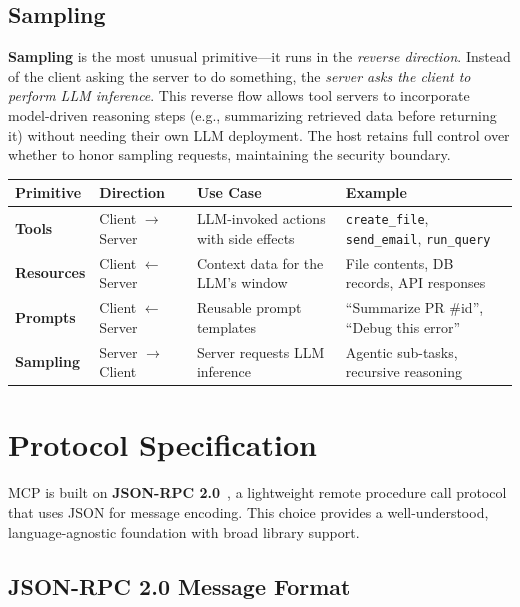 \subsection{Sampling}
\label{sampling}

\textbf{Sampling} is the most unusual primitive---it runs in the \emph{reverse direction}. Instead of the client asking the server to do something, the \emph{server asks the client to perform LLM inference}. This reverse flow allows tool servers to incorporate model-driven reasoning steps (e.g., summarizing retrieved data before returning it) without needing their own LLM deployment. The host retains full control over whether to honor sampling requests, maintaining the security boundary.

\begin{keybox}
\begin{tabular}{@{}lp{3.5cm}p{3.5cm}p{6cm}@{}}
\toprule
\textbf{Primitive} & \textbf{Direction} & \textbf{Use Case} & \textbf{Example} \\
\midrule
\textbf{Tools} & Client $\to$ Server & LLM-invoked actions with side effects & \texttt{create\_file}, \texttt{send\_email}, \texttt{run\_query} \\
\textbf{Resources} & Client $\leftarrow$ Server & Context data for the LLM’s window & File contents, DB records, API responses \\
\textbf{Prompts} & Client $\leftarrow$ Server & Reusable prompt templates & ``Summarize PR \#{id}'', ``Debug this error'' \\
\textbf{Sampling} & Server $\to$ Client & Server requests LLM inference & Agentic sub-tasks, recursive reasoning \\
\bottomrule
\end{tabular}
\end{keybox}

\section{Protocol Specification}
\label{sec:mcp:protocol}

MCP is built on \textbf{JSON-RPC 2.0}~\cite{jsonrpc2010spec}, a lightweight remote procedure call protocol that uses JSON for message encoding. This choice provides a well-understood, language-agnostic foundation with broad library support.

\subsection{JSON-RPC 2.0 Message Format}
\label{json-rpc-2.0-message-format}

